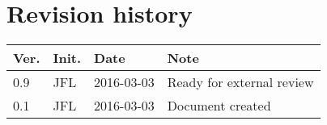 \chapter*{Revision history}
\label{app:rev_his}

\renewcommand\arraystretch{1.5}
\begin{tabular}{b{1cm} b{1.5cm} b{2cm} b{8cm}}
    \textbf{Ver.} & \textbf{Init.} & \textbf{Date} & \textbf{Note} \\
    \hline
    0.9 & JFL & 2016-03-03 & Ready for external review\\ \hline
    0.1 & JFL & 2016-03-03 & Document created \\
\end{tabular}
\renewcommand\arraystretch{1}